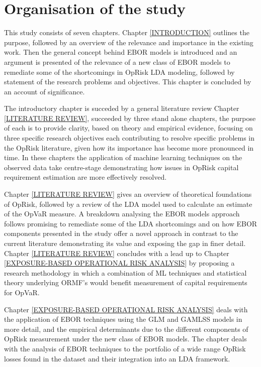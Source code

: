 \documentclass[
]{article}
\begin{document}
\section{Organisation of the study}
\label{sec:Organisation of the study}

This study consists of seven chapters. Chapter \ref{INTRODUCTION}
outlines the purpose, followed by an overview of the relevance and
importance in the existing work. Then the general concept behind EBOR
models is introduced and an argument is presented of the relevance of a
new class of EBOR models to remediate some of the shortcomings in OpRisk
LDA modeling, followed by statement of the research problems and
objectives. This chapter is concluded by an account of
significance.\medskip

The introductory chapter is succeded by a general literature review
Chapter \ref{LITERATURE REVIEW}, succeeded by three stand alone
chapters, the purpose of each is to provide clarity, based on theory and
empirical evidence, focusing on three specific research objectives each
contributing to resolve specific problems in the OpRisk literature,
given how its importance has become more pronounced in time. In these
chapters the application of machine learning techniques on the observed
data take centre-stage demonstrating how issues in OpRisk capital
requirement estimation are more effectively resolved.\medskip

Chapter \ref{LITERATURE REVIEW} gives an overview of theoretical
foundations of OpRisk, followed by a review of the LDA model used to
calculate an estimate of the OpVaR measure. A breakdown analysing the
EBOR models approach follows promising to remediate some of the LDA
shortcomings and on how EBOR components presented in the study offer a
novel approach in contrast to the current literature demonstrating its
value and exposing the gap in finer detail. Chapter
\ref{LITERATURE REVIEW} concludes with a lead up to Chapter
\ref{EXPOSURE-BASED OPERATIONAL RISK ANALYSIS} by proposing a research
methodology in which a combination of ML techniques and statistical
theory underlying ORMF's would benefit measurement of capital
requirements for OpVaR.\medskip

Chapter \ref{EXPOSURE-BASED OPERATIONAL RISK ANALYSIS} deals with the
application of EBOR techniques using the GLM and GAMLSS models in more
detail, and the empirical determinants due to the different components
of OpRisk measurement under the new class of EBOR models. The chapter
deals with the analysis of EBOR techniques to the portfolio of a wide
range OpRisk losses found in the dataset and their integration into an
LDA framework.
\end{document}
